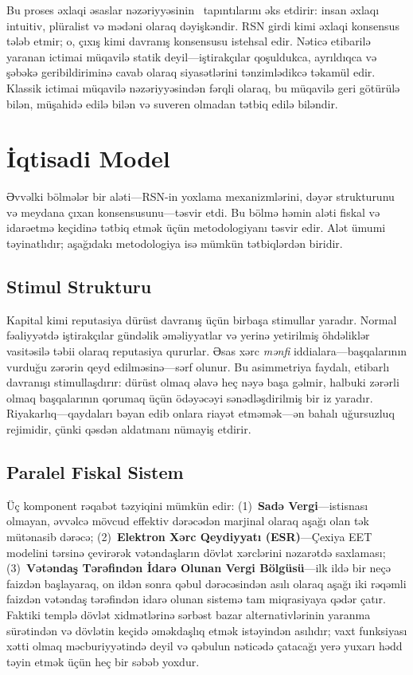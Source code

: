 \documentclass[11pt,a4paper,twocolumn]{article}
\begin{document}
Bu proses əxlaqi əsaslar nəzəriyyəsinin~\cite{haidt2012} tapıntılarını əks etdirir: insan əxlaqı intuitiv, plüralist və mədəni olaraq dəyişkəndir. RSN girdi kimi əxlaqi konsensus tələb etmir; o, çıxış kimi davranış konsensusu istehsal edir. Nəticə etibarilə yaranan ictimai müqavilə statik deyil---iştirakçılar qoşuldukca, ayrıldıqca və şəbəkə geribildiriminə cavab olaraq siyasətlərini tənzimlədikcə təkamül edir. Klassik ictimai müqavilə nəzəriyyəsindən fərqli olaraq, bu müqavilə geri götürülə bilən, müşahidə edilə bilən və suveren olmadan tətbiq edilə biləndir.

\section{İqtisadi Model}

Əvvəlki bölmələr bir aləti---RSN-in yoxlama mexanizmlərini, dəyər strukturunu və meydana çıxan konsensusunu---təsvir etdi. Bu bölmə həmin aləti fiskal və idarəetmə keçidinə tətbiq etmək üçün metodologiyanı təsvir edir. Alət ümumi təyinatlıdır; aşağıdakı metodologiya isə mümkün tətbiqlərdən biridir.

\subsection{Stimul Strukturu}

Kapital kimi reputasiya dürüst davranış üçün birbaşa stimullar yaradır. Normal fəaliyyətdə iştirakçılar gündəlik əməliyyatlar və yerinə yetirilmiş öhdəliklər vasitəsilə təbii olaraq reputasiya qururlar. Əsas xərc \emph{mənfi} iddialara---başqalarının vurduğu zərərin qeyd edilməsinə---sərf olunur. Bu asimmetriya faydalı, etibarlı davranışı stimullaşdırır: dürüst olmaq əlavə heç nəyə başa gəlmir, halbuki zərərli olmaq başqalarının qorumaq üçün ödəyəcəyi sənədləşdirilmiş bir iz yaradır. Riyakarlıq---qaydaları bəyan edib onlara riayət etməmək---ən bahalı uğursuzluq rejimidir, çünki qəsdən aldatmanı nümayiş etdirir.

\subsection{Paralel Fiskal Sistem}

Üç komponent rəqabət təzyiqini mümkün edir: (1)~\textbf{Sadə Vergi}---istisnası olmayan, əvvəlcə mövcud effektiv dərəcədən marjinal olaraq aşağı olan tək mütənasib dərəcə; (2)~\textbf{Elektron Xərc Qeydiyyatı (ESR)}---Çexiya EET modelini tərsinə çevirərək vətəndaşların dövlət xərclərini nəzarətdə saxlaması; (3)~\textbf{Vətəndaş Tərəfindən İdarə Olunan Vergi Bölgüsü}---ilk ildə bir neçə faizdən başlayaraq, on ildən sonra qəbul dərəcəsindən asılı olaraq aşağı iki rəqəmli faizdən vətəndaş tərəfindən idarə olunan sistemə tam miqrasiyaya qədər çatır. Faktiki templə dövlət xidmətlərinə sərbəst bazar alternativlərinin yaranma sürətindən və dövlətin keçidə əməkdaşlıq etmək istəyindən asılıdır; vaxt funksiyası xətti olmaq məcburiyyətində deyil və qəbulun nəticədə çatacağı yerə yuxarı hədd təyin etmək üçün heç bir səbəb yoxdur.
\end{document}
